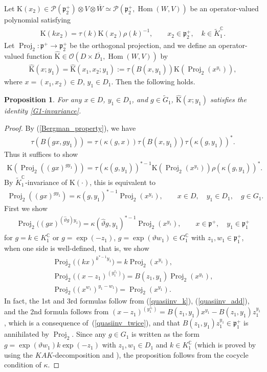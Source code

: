 \documentclass[11pt]{article}
\numberwithin{equation}{section}
\newtheorem{Proposition}[Theorem]{Proposition}
{ \theoremstyle{definition}
\newtheorem{Definition}[Theorem]{Definition}
\newtheorem{Note}[Theorem]{Note}
\newtheorem{Example}[Theorem]{Example}
\newtheorem{Remark}[Theorem]{Remark} }
\newcommand{\BC}{\mathbb{C}}
\newcommand{\fp}{\mathfrak{p}}
\newcommand{\cO}{\mathcal{O}}
\newcommand{\cP}{\mathcal{P}}
\newcommand{\rK}{\mathrm{K}}
\newcommand{\Hom}{\operatorname{Hom}}
\newcommand{\Proj}{\operatorname{Proj}}
\begin{document}
Let $\rK(x_2)\in\cP(\fp^+_2)\otimes V\otimes\overline{W}\simeq\cP(\fp^+_2,\Hom(W,V))$ be an operator-valued polynomial satisfying
\begin{gather}\label{K-invariance}
\rK(kx_2)=\tau(k)\rK(x_2)\rho(k)^{-1}, \qquad x_2\in \fp^+_2,\quad k\in \tilde{K}^\BC_1.
\end{gather}
Let $\Proj_2\colon \fp^+\to\fp^+_2$ be the orthogonal projection, and we define an operator-valued function $\hat{\rK}\in\cO(D\times \overline{D_1}, \Hom(W,V))$ by
\begin{gather}\label{Khat}
\hat{\rK}(x;y_1)=\hat{\rK}(x_1,x_2;y_1):=\tau(B(x,y_1))\rK(\Proj_2(x^{y_1})),
\end{gather}
where $x=(x_1,x_2)\in D$, $y_1\in D_1$. Then the following holds.
\begin{Proposition}\label{kernelfunc}
For any $x\in D$, $y_1\in D_1$, and $g\in\tilde{G}_1$, $\hat{\rK}(x;y_1)$ satisfies the identity \eqref{G1-invariance}.
\end{Proposition}
\begin{proof}
By (\ref{Bergman_property}), we have
\begin{gather*} \tau(B(gx,gy_1))=\tau(\kappa(g,x))\tau(B(x,y_1))\tau(\kappa(g,y_1))^*. \end{gather*}
Thus it suffices to show
\begin{gather*} \rK(\Proj_2((gx)^{gy_1}))=\tau(\kappa(g,y_1))^{*-1}\rK(\Proj_2(x^{y_1}))\rho(\kappa(g,y_1))^*. \end{gather*}
By $\tilde{K}^\BC_1$-invariance of $\rK(\cdot)$, this is equivalent to
\begin{gather*} \Proj_2((gx)^{gy_1})=\kappa(g,y_1)^{*-1}\Proj_2(x^{y_1}), \qquad x\in D,\quad y_1\in D_1,\quad g\in G_1. \end{gather*}
First we show
\begin{gather*} \Proj_2\big((gx)^{(\hat{\vartheta}g)y_1}\big)=\kappa(\hat{\vartheta}g,y_1)^{*-1}\Proj_2(x^{y_1}), \qquad x\in \fp^+,\quad y_1\in \fp^+_1 \end{gather*}
for $g=k\in K_1^\BC$ or $g=\exp(-z_1)$, $g=\exp(\vartheta w_1)\in G_1^\BC$ with $z_1,w_1\in\fp^+_1$,
when one side is well-defined, that is, we show
\begin{gather*}
\Proj_2\big((kx)^{k^{*-1}y_1}\big)=k\Proj_2(x^{y_1}), \\
\Proj_2\big((x-z_1)^{(y_1^{z_1})}\big)=B(z_1,y_1)\Proj_2(x^{y_1}), \\
\Proj_2\big((x^{w_1})^{y_1-w_1}\big)=\Proj_2(x^{y_1}).
\end{gather*}
In fact, the 1st and 3rd formulas follow from (\ref{quasiinv_k}), (\ref{quasiinv_add}),
and the 2nd formula follows from $(x-z_1)^{(y_1^{z_1})}=B(z_1,y_1)x^{y_1}-B(z_1,y_1)z_1^{y_1}$,
which is a consequence of~(\ref{quasiinv_twice}), and that $B(z_1,y_1)z_1^{y_1}\in\fp^+_1$ is annihilated by $\Proj_2$.
Since any $g\in G_1$ is written as the form $g=\exp(\vartheta w_1)k\exp(-z_1)$ with $z_1,w_1\in D_1$ and $k\in K^\BC_1$
(which is proved by using the $KAK$-decomposition and \cite[Part~III, Lemma~III.2.4]{FKKLR}),
the proposition follows from the cocycle condition of $\kappa$.
\end{proof}
\end{document}
